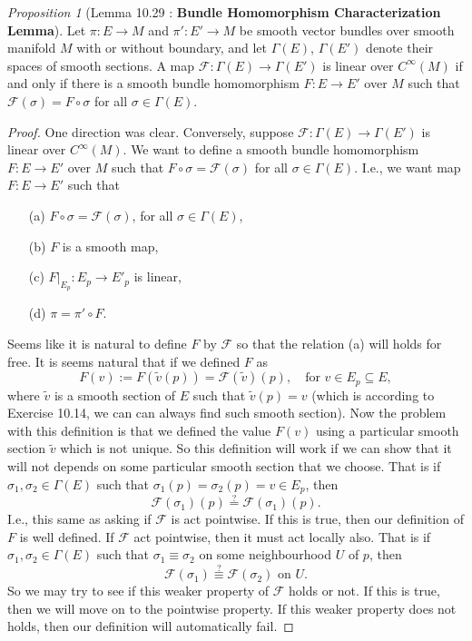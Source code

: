 \documentclass[a4paper]{article}
\theoremstyle{remark}
\newtheorem{prop}{Proposition}
\newcommand{\subhim}{\subseteq} %
\newcommand{\CM}{C^{\infty}(M)} %
\newcommand{\Esection}{\Gamma(E)} %
\newcommand{\Eprimesection}{\Gamma(E')}
\newcommand{\Fkeriting}{\mathscr{F}} %
\begin{document}
\begin{prop}[Lemma 10.29 : \textbf{Bundle Homomorphism Characterization Lemma}]
Let $\pi :E \to M$ and $\pi' : E' \to M$ be smooth vector bundles over smooth manifold $M$ with or without boundary, and let $\Gamma(E)$, $\Gamma(E')$ denote their spaces of smooth sections. A map $\mathscr{F} : \Esection \to \Eprimesection$ is linear over $\CM$ if and only if there is a smooth bundle homomorphism $F : E \to E'$ over $M$ such that $\mathscr{F} (\sigma) = F \circ \sigma$ for all $\sigma \in \Esection$.
\end{prop}
\begin{proof}
One direction was clear. Conversely, suppose $\Fkeriting : \Esection \to \Eprimesection$ is linear over $\CM$. We want to define a smooth bundle homomorphism $F : E \to E'$ over $M$ such that $F \circ \sigma = \Fkeriting (\sigma)$ for all $\sigma \in \Esection$. I.e., we want map $F : E \to E'$ such that
\begin{enumerate}[nolistsep]
\item[(a)] $F \circ \sigma = \Fkeriting (\sigma)$, for all $\sigma \in \Esection$,
\item[(b)] $F$ is a smooth map,
\item[(c)] $F|_{E_p} :E_p \to E'_p$ is linear,
\item[(d)] $\pi = \pi' \circ F $.
\end{enumerate}
Seems like it is natural to define $F$ by $\Fkeriting$ so that the relation (a) will holds for free. It is seems natural that if we defined $F$ as
$$
F(v):= F(\widetilde{v}(p)) = \Fkeriting(\widetilde{v}) (p), \quad \text{for }v \in E_p \subhim E,
$$
where $\widetilde{v}$ is a smooth section of $E$ such that $\widetilde{v} (p) = v$ (which is according to Exercise 10.14, we can can always find such smooth section). Now the problem with this definition is that we defined the value $F(v)$ using a particular smooth section $\widetilde{v}$ which is not unique. So this definition will work if we can show that it will not depends on some particular smooth section that we choose. That is if $\sigma_1, \sigma_2 \in \Esection$ such that $\sigma_1(p) = \sigma_2(p) = v \in E_p$, then 
$$
\Fkeriting (\sigma_1) (p) \overset{?}{=} \Fkeriting (\sigma_1)(p).
$$
I.e., this same as asking if $\Fkeriting$ is act pointwise. If this is true, then our definition of $F$ is well defined. If $\Fkeriting$ act pointwise, then it must act locally also. That is if $\sigma_1,\sigma_2 \in \Esection$ such that $\sigma_1 \equiv \sigma_2$ on some neighbourhood $U$ of $p$, then
$$
\Fkeriting (\sigma_1) \overset{?}{\equiv} \Fkeriting (\sigma_2) \, \, \text{on } U.
$$
So we may try to see if this weaker property of $\Fkeriting$ holds or not. If this is true, then we will move on to the pointwise property. If this weaker property does not holds, then our definition will automatically fail.  


\end{proof}
\end{document}
